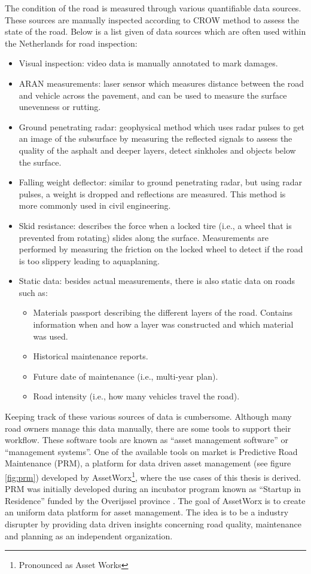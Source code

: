 The condition of the road is measured through various quantifiable data sources. These sources are manually inspected according to CROW method to assess the state of the road. Below is a list given of data sources which are often used within the Netherlands for road inspection:
\begin{itemize}
\item Visual inspection: video data is manually annotated to mark damages.
\item ARAN measurements: laser sensor which measures distance between the road and vehicle across the pavement, and can be used to measure the surface unevenness or rutting.
\item Ground penetrating radar: geophysical method which uses radar pulses to get an image of the subsurface by measuring the reflected signals to assess the quality of the asphalt and deeper layers, detect sinkholes and objects below the surface.
\item Falling weight deflector: similar to ground penetrating radar, but using radar pulses, a weight is dropped and reflections are measured. This method is more commonly used in civil engineering. 
\item Skid resistance: describes the force when a locked tire (i.e., a wheel that is prevented from rotating) slides along the surface. Measurements are performed by measuring the friction on the locked wheel to detect if the road is too slippery leading to aquaplaning.
\item Static data:  besides actual measurements, there is also static data on roads such as:
\begin{itemize}
\item Materials passport describing the different layers of the road. Contains information when and how a layer was constructed and which material was used.
\item Historical maintenance reports.
\item Future date of maintenance (i.e., multi-year plan). 
\item Road intensity (i.e., how many vehicles travel the road).
\end{itemize}
\end{itemize}

Keeping track of these various sources of data is cumbersome. Although many road owners manage this data manually, there are some tools to support their workflow. These software tools are known as ``asset management software'' or ``management systems''. One of the available tools on market is Predictive Road Maintenance (PRM), a platform for data driven asset management (see figure \ref{fig:prm}) developed by AssetWorx\footnote{Pronounced as Asset Works}, where the use cases of this thesis is derived. PRM was initially developed during an incubator program known as ``Startup in Residence'' funded by the Overijssel province \cite{Residense2020}. The goal of AssetWorx is to create an uniform data platform for asset management. The idea is to be a industry disrupter by providing data driven insights concerning road quality, maintenance and planning as an independent organization. 

